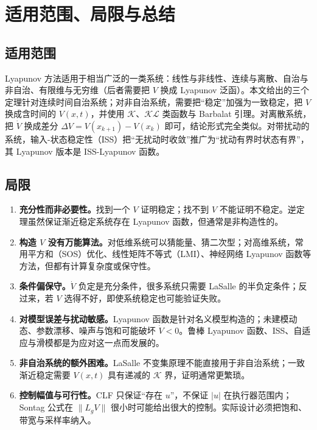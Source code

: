 \documentclass[11pt, a4paper, UTF8, fontset=none]{ctexart}
\theoremstyle{cnthm}
\newcommand{\norm}[1]{\lVert #1\rVert}
\newcommand{\abs}[1]{\lvert #1\rvert}
\newcommand{\Lg}{L_g}
\begin{document}
\section{适用范围、局限与总结}
\label{sec:scope}

\subsection{适用范围}

Lyapunov 方法适用于相当广泛的一类系统：线性与非线性、连续与离散、自治与非自治、有限维与无穷维（后者需要把 $V$ 换成 Lyapunov 泛函）。本文给出的三个定理针对连续时间自治系统；对非自治系统，需要把“稳定”加强为一致稳定，把 $V$ 换成含时间的 $V(x,t)$，并使用 $\mathcal{K}$、$\mathcal{KL}$ 类函数与 Barbalat 引理。对离散系统，把 $\dot V$ 换成差分 $\Delta V=V(x_{k+1})-V(x_k)$ 即可，结论形式完全类似。对带扰动的系统，输入-状态稳定性（ISS）把“无扰动时收敛”推广为“扰动有界时状态有界”，其 Lyapunov 版本是 ISS-Lyapunov 函数\cite{SontagWang1995}。

\subsection{局限}

\begin{enumerate}[label=(\arabic*)]
  \item \textbf{充分性而非必要性。}找到一个 $V$ 证明稳定；找不到 $V$ 不能证明不稳定。逆定理虽然保证渐近稳定系统存在 Lyapunov 函数，但通常是非构造性的。
  \item \textbf{构造 $V$ 没有万能算法。}对低维系统可以猜能量、猜二次型；对高维系统，常用平方和（SOS）优化、线性矩阵不等式（LMI）、神经网络 Lyapunov 函数等方法，但都有计算复杂度或保守性\cite{Boyd1994}。
  \item \textbf{条件偏保守。}$\dot V$ 负定是充分条件，很多系统只需要 LaSalle 的半负定条件；反过来，若 $V$ 选得不好，即使系统稳定也可能验证失败。
  \item \textbf{对模型误差与扰动敏感。}Lyapunov 函数是针对名义模型构造的；未建模动态、参数漂移、噪声与饱和可能破坏 $\dot V<0$。鲁棒 Lyapunov 函数、ISS、自适应与滑模都是为应对这一点而发展的。
  \item \textbf{非自治系统的额外困难。}LaSalle 不变集原理不能直接用于非自治系统；一致渐近稳定需要 $V(x,t)$ 具有递减的 $\mathcal{K}$ 界，证明通常更繁琐。
  \item \textbf{控制幅值与可行性。}CLF 只保证“存在 $u$”，不保证 $\abs{u}$ 在执行器范围内；Sontag 公式在 $\norm{\Lg V}$ 很小时可能给出很大的控制。实际设计必须把饱和、带宽与采样率纳入。
\end{enumerate}
\end{document}
